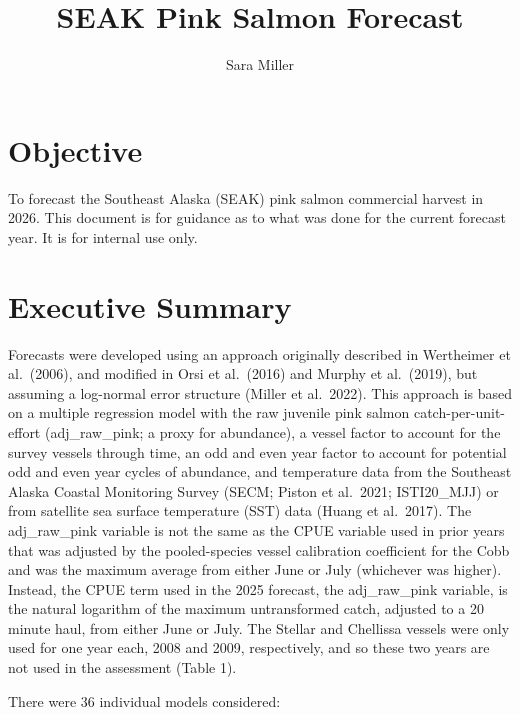 \documentclass[
  letterpaper,
  DIV=11,
  numbers=noendperiod]{scrartcl}
\title{SEAK Pink Salmon Forecast}
\author{Sara Miller}
\date{}
\begin{document}
\maketitle


\section{Objective}\label{objective}

To forecast the Southeast Alaska (SEAK) pink salmon commercial harvest
in 2026. This document is for guidance as to what was done for the
current forecast year. It is for internal use only.

\section{Executive Summary}\label{executive-summary}

Forecasts were developed using an approach originally described in
Wertheimer et al.~(2006), and modified in Orsi et al.~(2016) and Murphy
et al.~(2019), but assuming a log-normal error structure (Miller et
al.~2022). This approach is based on a multiple regression model with
the raw juvenile pink salmon catch-per-unit-effort (adj\_raw\_pink; a
proxy for abundance), a vessel factor to account for the survey vessels
through time, an odd and even year factor to account for potential odd
and even year cycles of abundance, and temperature data from the
Southeast Alaska Coastal Monitoring Survey (SECM; Piston et al.~2021;
ISTI20\_MJJ) or from satellite sea surface temperature (SST) data (Huang
et al.~2017). The adj\_raw\_pink variable is not the same as the CPUE
variable used in prior years that was adjusted by the pooled-species
vessel calibration coefficient for the Cobb and was the maximum average
from either June or July (whichever was higher). Instead, the CPUE term
used in the 2025 forecast, the adj\_raw\_pink variable, is the natural
logarithm of the maximum untransformed catch, adjusted to a 20 minute
haul, from either June or July. The Stellar and Chellissa vessels were
only used for one year each, 2008 and 2009, respectively, and so these
two years are not used in the assessment (Table 1).

There were 36 individual models considered:
\end{document}
